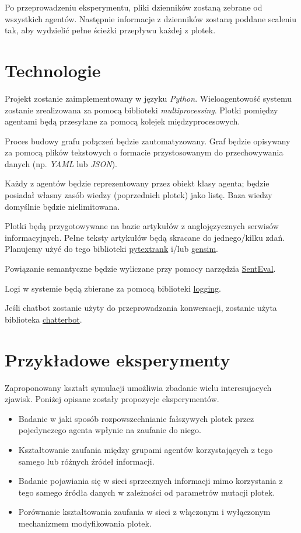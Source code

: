 \documentclass{article}
\begin{document}
	Po przeprowadzeniu eksperymentu, pliki dzienników zostaną zebrane od wszystkich agentów. Następnie informacje z dzienników zostaną poddane scaleniu tak, aby wydzielić pełne ścieżki przepływu każdej z plotek.
	\section{Technologie}
	Projekt zostanie zaimplementowany w języku \textit{Python}. Wieloagentowość systemu zostanie zrealizowana za pomocą biblioteki \textit{multiprocessing}. Plotki pomiędzy agentami będą przesyłane za pomocą kolejek międzyprocesowych.
	
	Proces budowy grafu połączeń będzie zautomatyzowany. Graf będzie opisywany za pomocą plików tekstowych o formacie przystosowanym do przechowywania danych (np. \textit{YAML} lub \textit{JSON}).
	
	Każdy z agentów będzie reprezentowany przez obiekt klasy agenta; będzie posiadał własny zasób wiedzy (poprzednich plotek) jako listę. Baza wiedzy domyślnie będzie nielimitowana.
	
	Plotki będą przygotowywane na bazie artykułów z anglojęzycznych serwisów informacyjnych. Pełne teksty artykułów będą skracane do jednego/kilku zdań. Planujemy użyć do tego biblioteki \href{https://github.com/DerwenAI/pytextrank}{pytextrank} i/lub \href{https://pypi.org/project/gensim/}{gensim}.
	
	Powiązanie semantyczne będzie wyliczane przy pomocy narzędzia \href{http://nlpprogress.com/english/semantic_textual_similarity.html}{SentEval}.
	
	Logi w systemie będą zbierane za pomocą biblioteki \href{https://docs.python.org/3/library/logging.html#module-logging}{logging}.
	
	Jeśli chatbot zostanie użyty do przeprowadzania konwersacji, zostanie użyta biblioteka \href{https://chatterbot.readthedocs.io/en/stable/}{chatterbot}.
	
	\section{Przykładowe eksperymenty}
	Zaproponowany kształt symulacji umożliwia zbadanie wielu interesujacych zjawisk. Poniżej opisane zostały propozycje eksperymentów.
	\begin{itemize}
	\item Badanie w jaki sposób rozpowszechnianie fałszywych plotek przez pojedynczego agenta wpłynie na zaufanie do niego.
	\item Kształtowanie zaufania między grupami agentów korzystających z tego samego lub różnych źródeł informacji.
	\item Badanie pojawiania się w sieci sprzecznych informacji mimo korzystania z tego samego źródła danych w zależności od parametrów mutacji plotek.
	\item Porównanie kształtowania zaufania w sieci z włączonym i wyłączonym mechanizmem modyfikowania plotek.
	\end{itemize}
\end{document}
